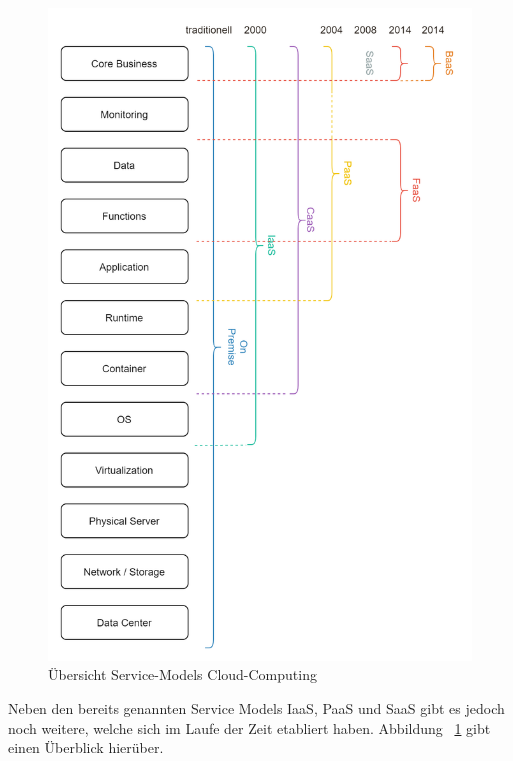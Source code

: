 \documentclass[11pt]{article}
\begin{document}
\begin{figure}[H]
\caption{Übersicht Service-Models Cloud-Computing}
\label{fig:cloudComputingConcepts}
\centering
\includegraphics[angle=90,width=1\textwidth]{serviceModels}
\end{figure}
Neben den bereits genannten Service Models IaaS, PaaS und SaaS gibt es jedoch noch weitere, welche sich im Laufe der Zeit etabliert haben. Abbildung ~\ref{fig:cloudComputingConcepts} gibt einen Überblick hierüber. 
\end{document}
